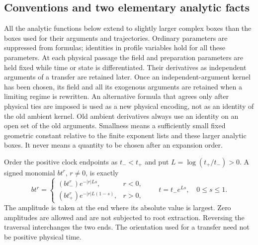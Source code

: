 \subsection{Conventions and two elementary analytic facts}

All the analytic functions below extend to slightly larger complex boxes
than the boxes used for their arguments and trajectories.  Ordinary
parameters are suppressed from formulas; identities in profile variables
hold for all these parameters.  At each physical passage the field and
preparation parameters are held fixed while time or state is differentiated.
Their derivatives as independent arguments of a transfer are retained later.
Once an independent-argument kernel has been chosen, its field and all its
exogenous arguments are retained when a limiting regime is rewritten.
An alternative formula that agrees only after physical ties are imposed is
used as a new physical encoding, not as an identity of the old ambient
kernel.  Old ambient derivatives always use an identity on an open set of
the old arguments.
Smallness means a sufficiently small fixed geometric constant relative to
the finite exponent lists and these larger analytic boxes.  It never means a
quantity to be chosen after an expansion order.

Order the positive clock endpoints as \(t_-<t_+\) and put
\(L=\log(t_+/t_-)>0\).  A signed monomial \(b t^r\), \(r\ne0\), is exactly
\begin{equation}\label{eq:terminal-power-layer}
 b t^r=
 \begin{cases}
 (b t_-^r)e^{-|r|Ls},&r<0,\\
 (b t_+^r)e^{-|r|L(1-s)},&r>0,
 \end{cases}
 \qquad t=t_-e^{Ls},\quad 0\le s\le1.
\end{equation}
The amplitude is taken at the end where its absolute value is largest.
Zero amplitudes are allowed and are not subjected to root extraction.
Reversing the traversal interchanges the two ends.  The orientation used for
a transfer need not be positive physical time.

